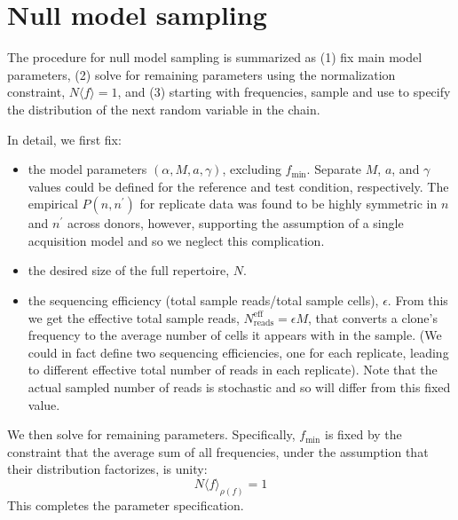 \documentclass[letterpaper,english,prl,reprint,longbibliography]{revtex4-1} %
\begin{document}
\section{Null model sampling}\label{sec:null_sampling}
The procedure for null model sampling is summarized as (1) fix main model parameters, (2) solve for remaining parameters using the normalization constraint, $N \langle f \rangle=1$, and (3) starting with frequencies, sample and use to specify the distribution of the next random variable in the chain.

In detail, we first fix:
\begin{itemize}
\item  the model parameters $(\alpha,M,a,\gamma)$, excluding $f_{\textrm{min}}$. Separate $M$, $a$, and $\gamma$ values could be defined for the reference and test condition, respectively. The empirical $P(n,n^{\prime})$ for replicate data was found to be highly symmetric in $n$ and $n^{\prime}$ across donors, however, supporting the assumption of a single acquisition model and so we neglect this complication. 
\item  the desired size of the full repertoire, $N$. 
\item the sequencing efficiency (total sample reads/total sample cells), $\epsilon$. From this we get the effective total sample reads, $N^{\textrm{eff}}_{\textrm{reads}}=\epsilon M$, that converts a clone's frequency to the average number of cells it appears with in the sample. (We could in fact define two sequencing efficiencies, one for each replicate, leading to different effective total number of reads in each replicate). Note that the actual sampled number of reads is stochastic and so will differ from this fixed value.
\end{itemize}
We then solve for remaining parameters. Specifically, $f_{\textrm{min}}$ is fixed by the constraint that the average sum of all frequencies, under the assumption that their distribution factorizes, is unity:
\begin{equation}
	N \langle f\rangle_{\rho(f)}=1
\end{equation}
This completes the parameter specification.
\end{document}

